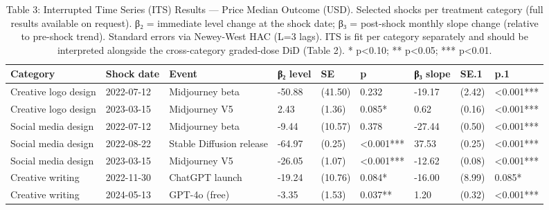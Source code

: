 \begin{table}[htbp]
\centering
\caption{Table 3: Interrupted Time Series (ITS) Results — Price Median Outcome (USD). Selected shocks per treatment category (full results available on request). β₂ = immediate level change at the shock date; β₃ = post-shock monthly slope change (relative to pre-shock trend). Standard errors via Newey-West HAC (L=3 lags). ITS is fit per category separately and should be interpreted alongside the cross-category graded-dose DiD (Table 2). * p<0.10; ** p<0.05; *** p<0.01.}
\label{tab:table3_its_results}
\begin{tabular}{lllllllll}
\toprule
Category & Shock date & Event & β₂ level & SE & p & β₃ slope & SE.1 & p.1 \\
\midrule
Creative logo design & 2022-07-12 & Midjourney beta & -50.88 & (41.50) & 0.232 & -19.17 & (2.42) & <0.001*** \\
Creative logo design & 2023-03-15 & Midjourney V5 & 2.43 & (1.36) & 0.085* & 0.62 & (0.16) & <0.001*** \\
Social media design & 2022-07-12 & Midjourney beta & -9.44 & (10.57) & 0.378 & -27.44 & (0.50) & <0.001*** \\
Social media design & 2022-08-22 & Stable Diffusion release & -64.97 & (0.25) & <0.001*** & 37.53 & (0.25) & <0.001*** \\
Social media design & 2023-03-15 & Midjourney V5 & -26.05 & (1.07) & <0.001*** & -12.62 & (0.08) & <0.001*** \\
Creative writing & 2022-11-30 & ChatGPT launch & -19.24 & (10.76) & 0.084* & -16.00 & (8.99) & 0.085* \\
Creative writing & 2024-05-13 & GPT-4o (free) & -3.35 & (1.53) & 0.037** & 1.20 & (0.32) & <0.001*** \\
\bottomrule
\end{tabular}
\end{table}
